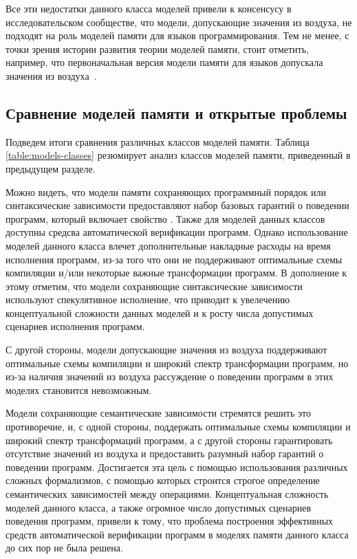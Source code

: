 Все эти недостатки данного класса моделей
привели к консенсусу в исследовательском сообществе,
что модели, допускающие значения из воздуха,
не подходят на роль моделей памяти 
для языков программирования.
Тем не менее, с точки зрения истории развития
теории моделей памяти, стоит отметить, например,
что первоначальная версия модели памяти для языков \CPP
допускала значения из воздуха~\cite{Batty-al:POPL11}.

\subsection{Сравнение моделей памяти и открытые проблемы}
\label{sec:models-summary}

Подведем итоги сравнения различных классов моделей памяти. 
Таблица \cref{table:models-classes} резюмирует 
анализ классов моделей памяти, приведенный в 
предыдущем разделе.



Можно видеть, что модели памяти сохраняющих 
программный порядок или синтаксические зависимости 
предоставляют набор базовых гарантий о поведении программ, 
который включает свойство \DRF. Также для моделей данных классов 
доступны средсва автоматической верификации программ.
Однако использование моделей данного класса влечет 
дополнительные накладные расходы на время исполнения программ, 
из-за того что они не поддерживают оптимальные схемы компиляции
и/или некоторые важные трансформации программ.
В дополнение к этому отметим, что модели сохраняющие
синтаксические зависимости используют спекулятивное исполнение, 
что приводит к увелечению концептуальной сложности данных моделей 
и к росту числа допустимых сценариев исполнения программ. 

С другой стороны, модели допускающие значения из воздуха 
поддерживают оптимальные схемы компиляции и широкий спектр 
трансформации программ, но из-за наличия значений из воздуха 
рассуждение о поведении программ в этих моделях становится невозможным. 

Модели сохраняющие семантические зависимости стремятся 
решить это противоречие, и, с одной стороны, 
поддержать оптимальные схемы компиляции и широкий спектр 
трансформаций программ, а с другой стороны 
гарантировать отсутствие значений из воздуха 
и предоставить разумный набор гарантий о поведении программ.
Достигается эта цель с помощью использования различных 
сложных формализмов, с помощью которых строится строгое определение
семантических зависимостей между операциями.
Концептуальная сложность моделей данного класса, 
а также огромное число допустимых сценариев поведения программ,
привели к тому, что проблема построения эффективных 
средств автоматической верификации программ в 
моделях памяти данного класса до сих пор не была решена. 


